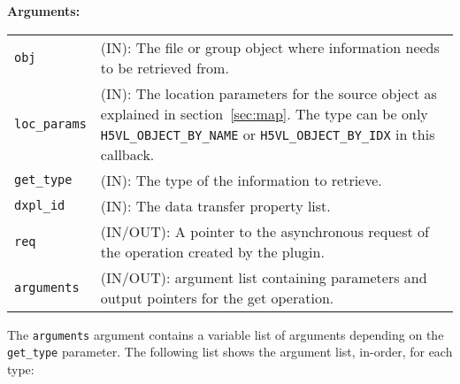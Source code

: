 \textbf{Arguments:}\\
\begin{tabular}{l p{10cm}}
  {\tt obj} & (IN): The file or group object where information needs to be
  retrieved from.\\
  {\tt loc\_params} & (IN): The location parameters for the source
  object as explained in section~\ref{sec:map}. The type can be only {\tt
    H5VL\_OBJECT\_BY\_NAME} or {\tt H5VL\_OBJECT\_BY\_IDX} in this
  callback.\\ 
  {\tt get\_type} & (IN): The type of the information to retrieve.\\
  {\tt dxpl\_id} & (IN): The data transfer property list.\\
  {\tt req} & (IN/OUT): A pointer to the asynchronous request of the
  operation created by the plugin.\\
  {\tt arguments} & (IN/OUT): argument list containing parameters and
  output pointers for the get operation. \\
\end{tabular}

The {\tt arguments} argument contains a variable list of arguments
depending on the {\tt get\_type} parameter. The following list shows
the argument list, in-order, for each type:

